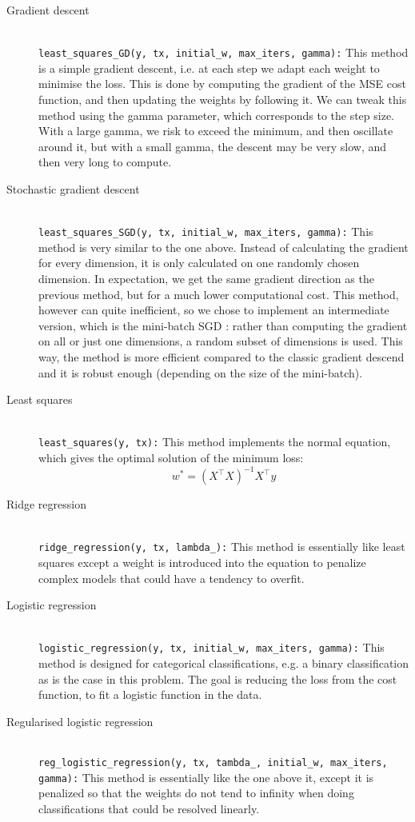 \documentclass[10pt,conference,compsocconf]{IEEEtran}
\newcommand{\code}[1]{\texttt{#1}} %
\begin{document}
\begin{description}

\item[Gradient descent] \ \\
\code{least\_squares\_GD(y, tx, initial\_w, max\_iters, gamma):} This method is a simple gradient descent, i.e. at each step we adapt each weight to minimise the loss. This is done by computing the gradient of the MSE cost function, and then updating the weights by following it. We can tweak this method using the gamma parameter, which corresponds to the step size. With a large gamma, we risk to exceed the minimum, and then oscillate around it, but with a small gamma, the descent may be very slow, and then very long to compute.

\item[Stochastic gradient descent] \ \\
\code{least\_squares\_SGD(y, tx, initial\_w, max\_iters, gamma):} This method is very similar to the one above. Instead of calculating the gradient for every dimension, it is only calculated on one randomly chosen dimension. In expectation, we get the same gradient direction as the previous method, but for a much lower computational cost. This method, however can quite inefficient, so we chose to implement an intermediate version, which is the mini-batch SGD : rather than computing the gradient on all or just one dimensions, a random subset of dimensions is used. This way, the method is more efficient compared to the classic gradient descend and it is robust enough (depending on the size of the mini-batch).

\item[Least squares] \ \\
\code{least\_squares(y, tx):} This method implements the normal equation, which gives the optimal solution of the minimum loss: $$w^* = (X^{\top}X)^{-1}X^{\top}y$$

\item[Ridge regression] \ \\
\code{ridge\_regression(y, tx, lambda\_):} This method is essentially like least squares except a weight is introduced into the equation to penalize complex models that could have a tendency to overfit.

\item[Logistic regression] \ \\
\code{logistic\_regression(y, tx, initial\_w, max\_iters, gamma):} This method is designed for categorical classifications, e.g. a binary classification as is the case in this problem. The goal is reducing the loss from the cost function, to fit a logistic function in the data.

\item[Regularised logistic regression] \ \\
\code{reg\_logistic\_regression(y, tx, tambda\_, initial\_w, max\_iters, gamma):} This method is essentially like the one above it, except it is penalized so that the weights do not tend to infinity when doing classifications that could be resolved linearly.

\end{description}
\end{document}

